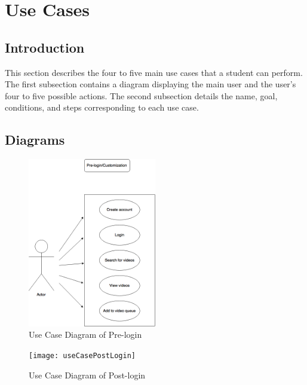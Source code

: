 \chapter{Use Cases}

\section{Introduction}
This section describes the four to five main use cases that a student can perform. The first subsection contains a diagram displaying the main user and the user's four to five possible actions. The second subsection details the name, goal, conditions, and steps corresponding to each use case. 

\section{Diagrams}
\begin{figure}[!ht]
      \centering
      \includegraphics[width=0.5\textwidth]{useCasePreLogin}
      \caption{Use Case Diagram of Pre-login}	
\end{figure}
\begin{figure}[!ht]
      \centering
      \texttt{[image: useCasePostLogin]}
      \caption{Use Case Diagram of Post-login}	
\end{figure}


